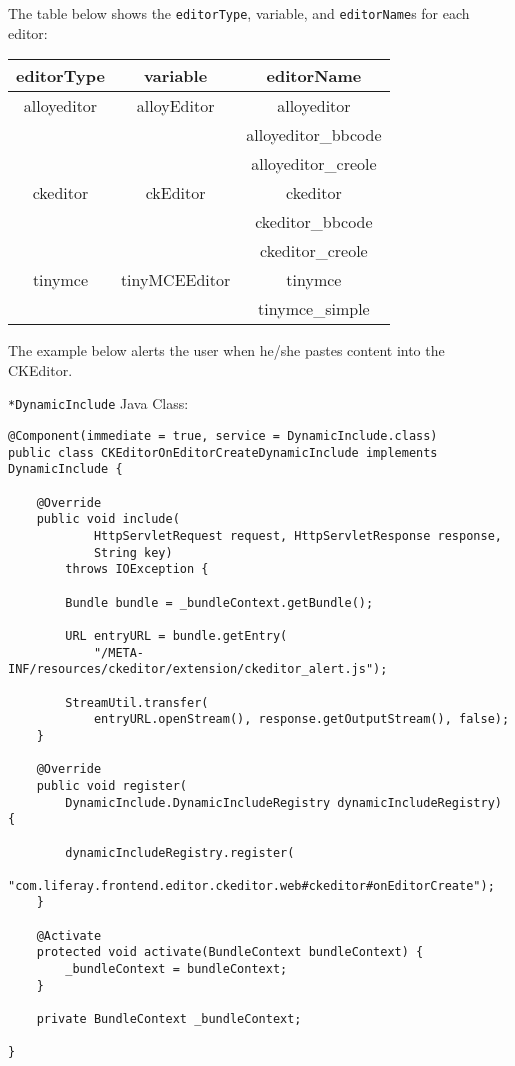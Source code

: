 The table below shows the \texttt{editorType}, variable, and
\texttt{editorName}s for each editor:

\begin{longtable}[]{@{}ccc@{}}
\toprule\noalign{}
editorType & variable & editorName \\
\midrule\noalign{}
\endhead
\bottomrule\noalign{}
\endlastfoot
alloyeditor & alloyEditor & alloyeditor \\
~ & ~ & alloyeditor\_bbcode \\
~ & ~ & alloyeditor\_creole \\
ckeditor & ckEditor & ckeditor \\
~ & ~ & ckeditor\_bbcode \\
~ & ~ & ckeditor\_creole \\
tinymce & tinyMCEEditor & tinymce \\
~ & ~ & tinymce\_simple \\
\end{longtable}

The example below alerts the user when he/she pastes content into the
CKEditor.

\texttt{*DynamicInclude} Java Class:

\begin{verbatim}
@Component(immediate = true, service = DynamicInclude.class)
public class CKEditorOnEditorCreateDynamicInclude implements DynamicInclude {

    @Override
    public void include(
            HttpServletRequest request, HttpServletResponse response,
            String key)
        throws IOException {

        Bundle bundle = _bundleContext.getBundle();

        URL entryURL = bundle.getEntry(
            "/META-INF/resources/ckeditor/extension/ckeditor_alert.js");

        StreamUtil.transfer(
            entryURL.openStream(), response.getOutputStream(), false);
    }

    @Override
    public void register(
        DynamicInclude.DynamicIncludeRegistry dynamicIncludeRegistry) {

        dynamicIncludeRegistry.register(
            "com.liferay.frontend.editor.ckeditor.web#ckeditor#onEditorCreate");
    }

    @Activate
    protected void activate(BundleContext bundleContext) {
        _bundleContext = bundleContext;
    }

    private BundleContext _bundleContext;

}
\end{verbatim}

